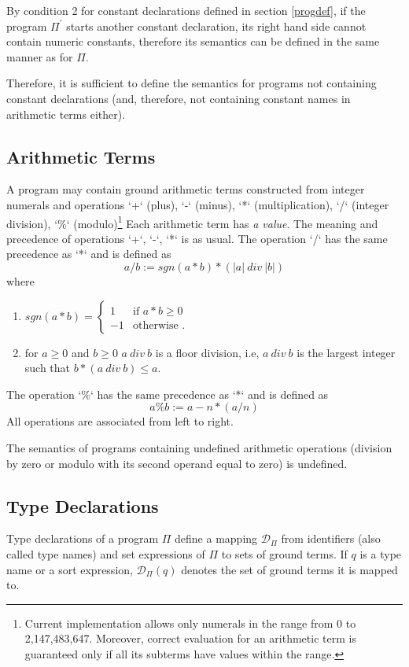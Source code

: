 \documentclass[a4paper,10pt]{article}
\begin{document}
\medskip\noindent
By condition 2 for constant declarations defined in section \ref{progdef}, if the program $\Pi^\prime$ starts another constant declaration, its right hand side cannot contain numeric constants, therefore its semantics can be defined in the same manner as for $\Pi$.
 
\medskip\noindent
Therefore, it is sufficient to define the semantics for programs not containing constant declarations (and, therefore, not containing constant names in arithmetic terms either).

\subsection{Arithmetic Terms}\label{at}

A program may contain ground arithmetic terms constructed from integer numerals and operations `+` (plus),  `-` (minus), `*` (multiplication), `/` (integer division), `\%` (modulo)\footnote{Current implementation allows only numerals in the range from 0 to 2,147,483,647. Moreover, correct evaluation for an arithmetic term is guaranteed only if all its subterms have values within the range.} Each arithmetic term  has \textit{a value}. 
The meaning and precedence of operations  `+`,  `-`, `*` is as usual. The  operation `/` has the same precedence as `*` and is defined as $$a/b := sgn(a*b) *(|a|~div~|b|)$$
where 
\begin{enumerate}
\item $sgn(a*b) = \begin{cases} 1 &\mbox{if } a *b \ge 0 \\
-1 & \mbox{otherwise }. \end{cases} $
\item for $a\ge 0$ and $b\ge0$ $a~div~b$ is a floor division, i.e, $a~div~b$ is the largest integer such that $b * (a~div~b)  \le  a$.
\end{enumerate}
The  operation `\%` has the same precedence as `*` and is defined as $$a\%b := a - n * (a/n) $$
All operations are associated from left to right. 


\medskip\noindent
The semantics of programs containing undefined arithmetic operations (division by zero or modulo with its second operand equal to zero) is undefined.  

  


\subsection{Type Declarations} \label{types}
Type declarations of a program $\Pi$  define a mapping $\mathcal{D}_\Pi$ from identifiers (also called type names) and set expressions of $\Pi$  to sets of ground terms. If $q$ is a type name or a sort expression, $\mathcal{D}_\Pi(q)$  denotes the set of ground terms it is mapped to. 
\end{document}
